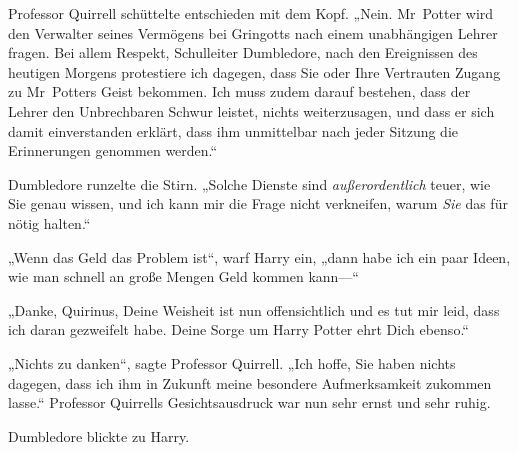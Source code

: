 Professor Quirrell schüttelte entschieden mit dem Kopf. „Nein. Mr~Potter wird den Verwalter seines Vermögens bei Gringotts nach einem unabhängigen Lehrer fragen. Bei allem Respekt, Schulleiter Dumbledore, nach den Ereignissen des heutigen Morgens protestiere ich dagegen, dass Sie oder Ihre Vertrauten Zugang zu Mr~Potters Geist bekommen. Ich muss zudem darauf bestehen, dass der Lehrer den Unbrechbaren Schwur leistet, nichts weiterzusagen, und dass er sich damit einverstanden erklärt, dass ihm unmittelbar nach jeder Sitzung die Erinnerungen genommen werden.“

Dumbledore runzelte die Stirn. „Solche Dienste sind \emph{außerordentlich} teuer, wie Sie genau wissen, und ich kann mir die Frage nicht verkneifen, warum \emph{Sie} das für nötig halten.“

„Wenn das Geld das Problem ist“, warf Harry ein, „dann habe ich ein paar Ideen, wie man schnell an große Mengen Geld kommen kann—“

„Danke, Quirinus, Deine Weisheit ist nun offensichtlich und es tut mir leid, dass ich daran gezweifelt habe. Deine Sorge um Harry Potter ehrt Dich ebenso.“

„Nichts zu danken“, sagte Professor Quirrell. „Ich hoffe, Sie haben nichts dagegen, dass ich ihm in Zukunft meine besondere Aufmerksamkeit zukommen lasse.“ Professor Quirrells Gesichtsausdruck war nun sehr ernst und sehr ruhig.

Dumbledore blickte zu Harry.

